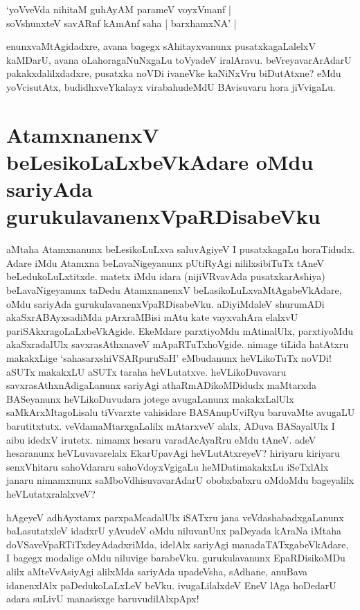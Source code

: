 \begin{shloka}
`yoVveVda nihitaM guhAyAM parameV voyxVmanf |\label{108}\\
soV\s shunxteV savARnf kAmAnf saha | barxhamxNA' |
\end{shloka}
enunxvaMtAgidadxre, avana bagegx sAhitayxvanunx pusatxkagaLalelxV kaMDarU, avana oLahoragaNuNxgaLu toVyadeV iralAravu. beVreyavarArAdarU pakakxdalilxdadxre, pusatxka noVDi ivaneVke kaNiNxVru biDutAtxne? eMdu yoVcisutAtx, budidhxveYkalayx virabahudeMdU BAvisuvaru hora jiVvigaLu.

\section*{AtamxnanenxV beLesikoLaLxbeVkAdare oMdu sariyAda gurukulavanenxVpaRDisabeVku}

aMtaha Atamxnanunx beLesikoLuLxva saluvAgiyeV I pusatxkagaLu horaTidudx. Adare iMdu Atamxna beLavaNigeyanunx pUtiRyAgi nililxsibiTuTx tAneV beLedukoLuLxtitxde. matetx iMdu idara (nijiVRvavAda pusatxkarAshiya) beLavaNigeyanunx taDedu AtamxnanenxV beLasikoLuLxvaMtAgabeVkAdare, oMdu sariyAda gurukulavanenxVpaRDisabeVku. aDiyiMdaleV shurumADi akaSxrABAyxsadiMda pArxraMBisi mAtu kate vayxvahAra elalxvU pariSAkxragoLaLxbeVkAgide. EkeMdare parxtiyoMdu mAtinalUlx, parxtiyoMdu akaSxradalUlx savxrasAthxnaveV mApaRTuTxhoVgide. nimage tiLida hatAtxru makakxLige `sahasarxshiVSARpuruSaH'\label{108a} eMbudanunx heVLikoTuTx noVDi! aSUTx makakxLU aSUTx taraha heVLutatxve. heVLikoDuvavaru savxrasAthxnAdigaLanunx sariyAgi athaRmADikoMDidudx maMtarxda BASeyanunx heVLikoDuvudara jotege avugaLanunx makakxLalUlx saMkArxMtagoLisalu tiVvarxte vahisidare BASAnupUviRyu baruvaMte avugaLU barutitxtutx. veVdamaMtarxgaLalilx mAtarxveV alalx, ADuva BASayalUlx I aibu idedxV irutetx. nimamx hesaru varadAcAyaRru eMdu tAneV. adeV hesaranunx heVLuvavarelalx EkarUpavAgi heVLutAtxreyeV? hiriyaru kiriyaru senxVhitaru sahoVdararu sahoVdoyxVgigaLu heMDatimakakxLu iSeTxlAlx janaru nimamxnunx saMboVdhisuvavarAdarU obobxbabxru oMdoMdu bageyalilx heVLutatxralalxveV?

hAgeyeV adhAyxtamx  parxpaMcadalUlx iSATxru jana veVdashabadxgaLanunx baLasutatxleV idadxrU yAvudeV oMdu niluvanUnx paDeyada kAraNa iMtaha doVSaveVpaRTiTxdeyAdadxriMda, idelAlx sariyAgi manadaTATxgabeVkAdare, I bagegx modalige oMdu niluvige barabeVku. gurukulavanunx EpaRDisikoMDu alilx aMteVvAsiyAgi alilxMda sariyAda upadeVsha, sAdhane, anuBava idanenxlAlx paDedukoLaLxLeV beVku. ivugaLilalxdeV EneV lAga hoDedarU adara suLivU manasisxge baruvudilAlxpApx!


